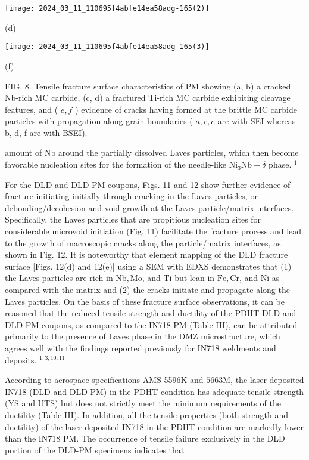 \documentclass[10pt]{article}
\begin{document}
\begin{center}
\texttt{[image: 2024\_03\_11\_110695f4abfe14ea58adg-165(2)]}
\end{center}

(d)

\begin{center}
\texttt{[image: 2024\_03\_11\_110695f4abfe14ea58adg-165(3)]}
\end{center}

(f)

FIG. 8. Tensile fracture surface characteristics of PM showing (a, b) a cracked Nb-rich MC carbide, (c, d) a fractured Ti-rich MC carbide exhibiting cleavage features, and ( $e, f$ ) evidence of cracks having formed at the brittle MC carbide particles with propagation along grain boundaries ( $a, c, e$ are with SEI whereas b, d, f are with BSEI).

amount of $\mathrm{Nb}$ around the partially dissolved Laves particles, which then become favorable nucleation sites for the formation of the needle-like $\mathrm{Ni}_{3} \mathrm{Nb}-\delta$ phase. ${ }^{1}$

For the DLD and DLD-PM coupons, Figs. 11 and 12 show further evidence of fracture initiating initially through cracking in the Laves particles, or debonding/decohesion and void growth at the Laves particle/matrix interfaces. Specifically, the Laves particles that are propitious nucleation sites for considerable microvoid initiation (Fig. 11) facilitate the fracture process and lead to the growth of macroscopic cracks along the particle/matrix interfaces, as shown in Fig. 12. It is noteworthy that element mapping of the DLD fracture surface [Figs. 12(d) and 12(e)] using a SEM with EDXS demonstrates that (1) the Laves particles are rich in $\mathrm{Nb}, \mathrm{Mo}$, and $\mathrm{Ti}$ but lean in $\mathrm{Fe}, \mathrm{Cr}$, and $\mathrm{Ni}$ as compared with the matrix and (2) the cracks initiate and propagate along the Laves particles. On the basis of these fracture surface observations, it can be reasoned that the reduced tensile strength and ductility of the PDHT DLD and DLD-PM coupons, as compared to the IN718 PM (Table III), can be attributed primarily to the presence of Laves phase in the DMZ microstructure, which agrees well with the findings reported previously for IN718 weldments and deposits. ${ }^{1,3,10,11}$

According to aerospace specifications AMS 5596K and $5663 \mathrm{M}$, the laser deposited IN718 (DLD and DLD-PM) in the PDHT condition has adequate tensile strength (YS and UTS) but does not strictly meet the minimum requirements of the ductility (Table III). In addition, all the tensile properties (both strength and ductility) of the laser deposited IN718 in the PDHT condition are markedly lower than the IN718 PM. The occurrence of tensile failure exclusively in the DLD portion of the DLD-PM specimens indicates that
\end{document}
